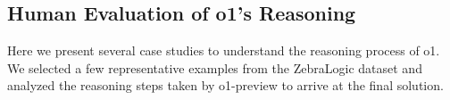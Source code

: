 \subsection{Human Evaluation of o1's Reasoning} 
Here we present several case studies to understand the reasoning process of o1. 
We selected a few representative examples from the ZebraLogic dataset and analyzed the reasoning steps taken by o1-preview to arrive at the final solution.


\begin{comment}
Taking a closer look
Analyzing the provided puzzle’s constraints, I focus on the three houses, their unique occupants, drinks, and hobbies. Each person has distinct attributes, guiding me through the solution steps methodically.
Piecing together the clues
Starting by organizing a table for houses 1 to 3, listing attributes: Name, Drink, Hobby. Progress involves placing Arnold (not in house 1) and Eric (milk).
Pinpointing preferences
I’m working through the clues to identify who likes milk, cooking, and water. Eric enjoys milk, Arnold drinks water, and they can’t be in certain houses.
Placing roles and likes
OK, let me see. The photography enthusiast is in either house 2 or 3. Eric, who likes milk, cannot be in house 2. This suggests he must be in house 1 or 3, with a cook immediately to his left.
Nailing down house positions
OK, let me see. Eric’s in house 3 with milk. Cooking’s in house 2, next to Eric. Photography’s in house 2 or 3.
Figuring out Arnold’s role
OK, let me see. Arnold can’t be in house 1 since Clue 1 rules it out. So, Arnold’s either in house 2 or 3. Clearly, Arnold is in house 2 with a cooking passion and water as his drink.
Mapping out the assignment
I’m organizing the details: Peter is in house 1, Arnold is in house 2, and Eric is in house 3. Peter drinks tea, Arnold drinks water, and Eric drinks milk, with Peter’s hobby being gardening, Arnold’s being cooking, and Eric’s being photography.
Piecing together clues
I traced the deduction that Arnold is in house 2, Eric likes milk and lives in house 3, and Arnold drinks water, consistent with the clues.
Locating Arnold
I’ve figured out that Arnold is in house 2, loves cooking, and drinks water. Meanwhile, Eric is in house 3, drinks milk, and is into photography.


--->


public  output:



\end{comment}
